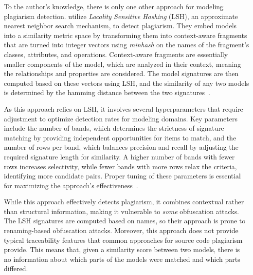 To the author's knowledge, there is only one other approach for modeling plagiarism detection.
\citet{Martinez2020} utilize \emph{Locality Sensitive Hashing} (LSH), an approximate nearest neighbor search mechanism, to detect plagiarism. They embed models into a similarity metric space by transforming them into context-aware fragments that are turned into integer vectors using \textit{minhash} on the names of the fragment's classes, attributes, and operations.
Context-aware fragments are essentially smaller components of the model, which are analyzed in their context, meaning the relationships and properties are considered.
The model signatures are then computed based on these vectors using LSH, and the similarity of any two models is determined by the hamming distance between the two signatures~\cite{Martinez2022}. 

As this approach relies on LSH, it involves several hyperparameters that require adjustment to optimize detection rates for modeling domains. Key parameters include the number of bands, which determines the strictness of signature matching by providing independent opportunities for items to match, and the number of rows per band, which balances precision and recall by adjusting the required signature length for similarity. A higher number of bands with fewer rows increases selectivity, while fewer bands with more rows relax the criteria, identifying more candidate pairs. Proper tuning of these parameters is essential for maximizing the approach's effectiveness~\cite{Martinez2020}.

While this approach effectively detects plagiarism, it combines contextual rather than structural information, making it vulnerable to \textit{some} obfuscation attacks.
The LSH signatures are computed based on names, so their approach is prone to renaming-based obfuscation attacks.
Moreover, this approach does not provide typical traceability features that common approaches for source code plagiarism provide.
This means that, given a similarity score between two models, there is no information about which parts of the models were matched and which parts differed.